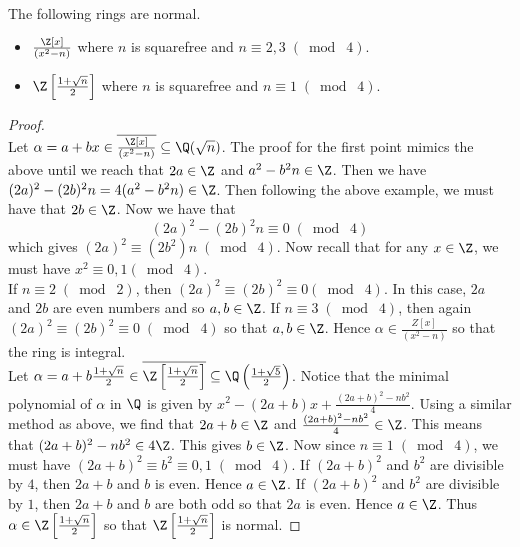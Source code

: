 \documentclass[a4paper]{article}
\begin{document}
\begin{eg}{}{}\\
The following rings are normal. 
\begin{itemize}
\item $\frac{\Z[x]}{(x^2-n)}$ where $n$ is squarefree and $n\equiv2,3\;(\bmod\;4)$. 
\item $\Z\left[\frac{1+\sqrt{n}}{2}\right]$ where $n$ is squarefree and $n\equiv1\;(\bmod\;4)$. 
\end{itemize}
\begin{proof}\\
Let $\alpha=a+bx\in\overline{\frac{\Z[x]}{(x^2-n)}}\subseteq\Q(\sqrt{n})$. The proof for the first point mimics the above until we reach that $2a\in\Z$ and $a^2-b^2n\in\Z$. Then we have $(2a)^2-(2b)^2n=4(a^2-b^2n)\in\Z$. Then following the above example, we must have that $2b\in\Z$. Now we have that $$(2a)^2-(2b)^2n\equiv 0\;(\bmod\;4)$$ which gives $(2a)^2\equiv(2b^2)n\;(\bmod\;4)$. Now recall that for any $x\in\Z$, we must have $x^2\equiv0,1(\bmod\;4)$. \\

If $n\equiv2\;(\bmod\;2)$, then $(2a)^2\equiv(2b)^2\equiv0(\bmod\;4)$. In this case, $2a$ and $2b$ are even numbers and so $a,b\in\Z$.  If $n\equiv3\;(\bmod\;4)$, then again $(2a)^2\equiv(2b)^2\equiv0\;(\bmod\;4)$ so that $a,b\in\Z$. Hence $\alpha\in\frac{Z[x]}{(x^2-n)}$ so that the ring is integral.\\

Let $\alpha=a+b\frac{1+\sqrt{n}}{2}\in\overline{\Z\left[\frac{1+\sqrt{n}}{2}\right]}\subseteq\Q\left(\frac{1+\sqrt{5}}{2}\right)$. Notice that the minimal polynomial of $\alpha$ in $\Q$ is given by $x^2-(2a+b)x+\frac{(2a+b)^2-nb^2}{4}$. Using a similar method as above, we find that $2a+b\in\Z$ and $\frac{(2a+b)^2-nb^2}{4}\in\Z$. This means that $(2a+b)^2-nb^2\in 4\Z$. This gives $b\in\Z$. Now since $n\equiv1\;(\bmod\;4)$, we must have $(2a+b)^2\equiv b^2\equiv 0,1\;(\bmod\;4)$. If $(2a+b)^2$ and $b^2$ are divisible by $4$, then $2a+b$ and $b$ is even. Hence $a\in\Z$. If $(2a+b)^2$ and $b^2$ are divisible by $1$, then $2a+b$ and $b$ are both odd so that $2a$ is even. Hence $a\in\Z$. Thus $\alpha\in\Z\left[\frac{1+\sqrt{n}}{2}\right]$ so that $\Z\left[\frac{1+\sqrt{n}}{2}\right]$ is normal. 
\end{proof}
\end{eg}
\end{document}

